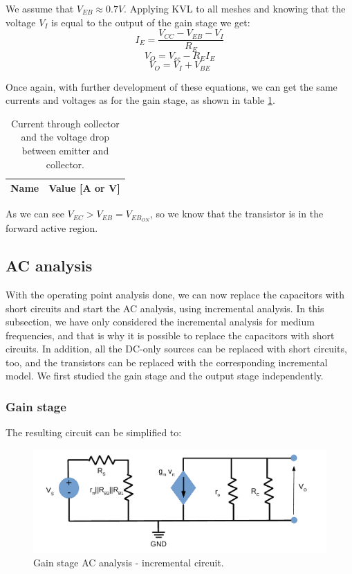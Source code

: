We assume that $V_{EB}\approx 0.7V$.
Applying KVL to all meshes and knowing that the voltage $V_{I}$ is equal to the output of the gain stage we get:
\begin{equation}
    I_{E}=\frac{V_{CC}-V_{EB}-V_{I}}{R_{E}}
\end{equation}
\begin{equation}
    V_{O}=V_{cc}-R_{E}I_{E}
\end{equation}
\begin{equation}
    V_{O}=V_{I}+V_{BE}
\end{equation}

Once again, with further development of these equations, we can get the same currents and voltages as for the gain stage, as shown in table \ref{tab:op2_tab}.

\begin{table}[h]
    \centering
    \begin{tabular}{|l|r|}
      \hline
      {\bf Name} & {\bf Value [A or V]} \\ \hline
      
    \end{tabular}
    \caption{Current through collector and the voltage drop between emitter and collector.}
    \label{tab:op2_tab}
  \end{table}

As we can see $V_{EC} > V_{EB}=V_{EB_{ON}}$, so we know that the transistor is in the forward active region.

\subsection{AC analysis}
With the operating point analysis done, we can now replace the capacitors with short circuits and start the AC analysis, using incremental analysis. 
In this subsection, we have only considered the incremental analysis for medium frequencies, and that is why it is possible to replace the capacitors with short circuits. 
In addition, all the DC-only sources can be replaced with short circuits, too, and the transistors can be replaced with the corresponding incremental model. 
We first studied the gain stage and the output stage independently.

\subsubsection{Gain stage}
The resulting circuit can be simplified to:

\begin{figure}[h] \centering
    \includegraphics[width=17cm]{lab4_AC1.pdf}
    \caption{Gain stage AC analysis - incremental circuit.}
    \label{fig:AC1 analysis}
\end{figure}

